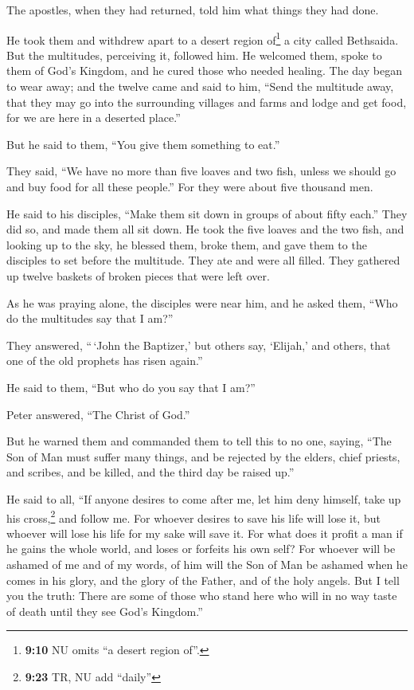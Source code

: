  The apostles, when they had returned, told him what
things they had done.

He took them and withdrew apart to a desert region of\footnote{\textbf{9:10}
  NU omits ``a desert region of''.} a city called Bethsaida.
 But the multitudes, perceiving it, followed him. He
welcomed them, spoke to them of God's Kingdom, and he cured those who
needed healing.  The day began to wear away; and the
twelve came and said to him, ``Send the multitude away, that they may go
into the surrounding villages and farms and lodge and get food, for we
are here in a deserted place.''

 But he said to them, ``You give them something to eat.''

They said, ``We have no more than five loaves and two fish, unless we
should go and buy food for all these people.''  For they
were about five thousand men.

He said to his disciples, ``Make them sit down in groups of about fifty
each.''  They did so, and made them all sit down.
 He took the five loaves and the two fish, and looking up
to the sky, he blessed them, broke them, and gave them to the disciples
to set before the multitude.  They ate and were all
filled. They gathered up twelve baskets of broken pieces that were left
over.

 As he was praying alone, the disciples were near him,
and he asked them, ``Who do the multitudes say that I am?''

 They answered, ``\,`John the Baptizer,' but others say,
`Elijah,' and others, that one of the old prophets has risen again.''

 He said to them, ``But who do you say that I am?''

Peter answered, ``The Christ of God.''

 But he warned them and commanded them to tell this to no
one,  saying, ``The Son of Man must suffer many things,
and be rejected by the elders, chief priests, and scribes, and be
killed, and the third day be raised up.''

 He said to all, ``If anyone desires to come after me,
let him deny himself, take up his cross,\footnote{\textbf{9:23} TR, NU
  add ``daily''} and follow me.  For whoever desires to
save his life will lose it, but whoever will lose his life for my sake
will save it.  For what does it profit a man if he gains
the whole world, and loses or forfeits his own self?  For
whoever will be ashamed of me and of my words, of him will the Son of
Man be ashamed when he comes in his glory, and the glory of the Father,
and of the holy angels.  But I tell you the truth: There
are some of those who stand here who will in no way taste of death until
they see God's Kingdom.''

